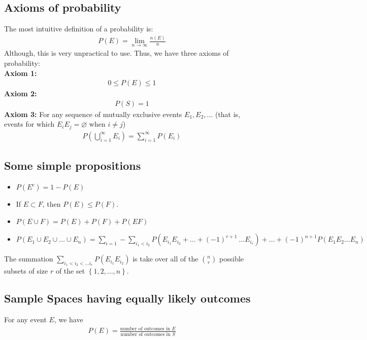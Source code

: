 \documentclass[a4paper]{article}
\begin{document}
\subsection{Axioms of probability} %
\label{sub:Axioms of probability}
The most intuitive definition of a probability is:
\begin{align}
  P(E)= \lim_{n \rightarrow \infty} \frac{n(E)}{n} 
\end{align}
Although, this is very unpractical to use. Thus, we have three axioms of probability: \\
{\bf Axiom 1:}
\begin{align}
  0 \leq P(E) \leq 1
\end{align}
{\bf Axiom 2:}
\begin{align}
  P(S)=1
\end{align}
{\bf Axiom 3:}
For any sequence of mutually exclusive events $E_1,E_2,\dots$ (that is, events for which $E_iE_j=\varnothing$ when $i \neq j$)
\begin{align}
  P(\bigcup_{i=1}^{\infty} E_i) = \sum_{i=1}^{\infty}P(E_i)
\end{align}
\subsection{Some simple propositions} %
\label{sub:Some simple propositions}
\begin{itemize}
  \item $P(E^c) = 1-P(E)$
  \item If $E \subset F$, then $P(E) \leq P(F)$.
  \item $P(E \cup F) = P(E) + P(F) + P(EF)$
  \item $P(E_1 \cup E_2 \cup \dots \cup E_n) = \sum_{i=1} - \sum_{i_1 < i_2}P(E_{i_1} E_{i_2}+ \dots 
    + (-1)^{r+1} \ \dots E_{i_r}) + \dots + (-1)^{n+1}P(E_1 E_2 \dots E_n)$
\end{itemize}
The summation $\sum_{i_1< i_2 < \dots i_r} P(E_{i_1} E_{i_2})$ is take over all of the ${ n \choose r}$ possible subsets of size $r$ of the set $\left\{ 1,2,\dots, n \right\}$.
\subsection{Sample Spaces having equally likely outcomes} %
\label{sub:Sample Spaces having euqlly likey outcomes}
For any event $E$, we have
\begin{align}
  P(E) = \frac{\text{number of outcomes in }E}{\text{number of outcomes in }S}
\end{align}
\end{document}
